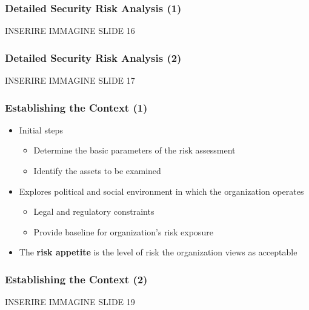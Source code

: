 \documentclass[xcolor ={table,usenames,dvipsnames}]{beamer}
\theoremstyle{definition}
\begin{document}
	\begin{frame}
		\frametitle{Detailed Security Risk Analysis (1)}
		INSERIRE IMMAGINE SLIDE 16
	\end{frame}
	
	\begin{frame}
		\frametitle{Detailed Security Risk Analysis (2)}
		INSERIRE IMMAGINE SLIDE 17
	\end{frame}

	\begin{frame}
		\frametitle{Establishing the Context (1)}
		\begin{itemize}
			\item	Initial steps 
			\begin{itemize}
				\item Determine the basic parameters of the risk assessment
				\item Identify the assets to be examined
			\end{itemize}
			\item Explores political and social environment in which the organization operates \begin{itemize}
				\item 	Legal and regulatory constraints
				\item	Provide baseline for organization’s risk exposure
			\end{itemize}
			\item The \textbf{risk appetite} is the level of risk the organization views as acceptable
		\end{itemize}	
	\end{frame}

	\begin{frame}
		\frametitle{Establishing the Context (2)}
		INSERIRE IMMAGINE SLIDE 19
	\end{frame}
\end{document}
